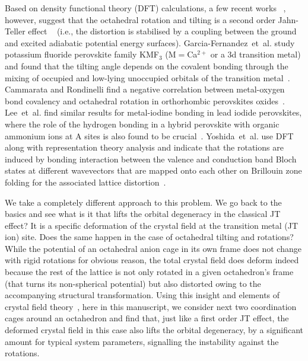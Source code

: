\documentclass[a4paper,prb,twocolumn]{revtex4-1}  %
\newcommand{\az}[1]{{\color{magenta}{#1}}} %
\begin{document}
Based on density functional theory (DFT) calculations,
a few recent works
~\cite{garcia-fernandezJPCL10,CammarataJCP14,LeeCM16,YoshidaPRL21}, 
however, 
suggest that the octahedral rotation and tilting is 
a second order Jahn-Teller effect
~\cite{HerzbergZPC33,BersukerPL66,KristoffelPSSB67,PearsonJMS83,FultonJCP04,BersukerCR13}
(i.e., the distortion is stabilised by a coupling between the ground and excited adiabatic potential energy surfaces).
Garcia-Fernandez~et~al.
study
potassium fluoride perovskite family KMF$_3$ (M$=$Ca$^{2+}$ or a $3$d transition metal)
and found that the tilting angle
depends on the covalent bonding through the mixing of occupied and 
low-lying unoccupied orbitals of the transition metal~\cite{garcia-fernandezJPCL10}.
Cammarata and Rondinelli
find a negative correlation between metal-oxygen bond covalency 
and octahedral rotation in orthorhombic perovskites oxides~\cite{CammarataJCP14}.
Lee~et~al. find 
similar results for metal-iodine bonding in
lead iodide perovskites,
where the role of 
the hydrogen bonding 
in a hybrid perovskite with
organic ammonium ions at A sites
is also found to be crucial~\cite{LeeCM16}.
Yoshida~et~al.
use DFT along with 
representation theory analysis 
and 
indicate that 
the rotations are induced by bonding interaction 
between the valence and conduction band Bloch states at different wavevectors
that are mapped onto each other on Brillouin zone folding
 for the associated lattice distortion~\cite{YoshidaPRL21}.
 


We take a completely different approach to this problem.
We go back to the basics
and see 
what is it that lifts 
 the orbital degeneracy in the classical JT effect?
It is a specific 
deformation of the crystal field 
at the transition metal (JT ion) site.
Does the same happen in the case of octahedral tilting and rotations?
While the potential of an octahedral anion cage 
in its own frame
does not change 
with
rigid rotations for obvious reason,
the total crystal field 
does deform indeed
because
 the rest of the lattice is not only rotated
  in a given octahedron's frame (that turns its non-spherical potential)
 but also distorted owing to the accompanying structural transformation.
Using this insight
and elements of crystal field theory~\cite{BetheAP29,VanVleckPR32,PavariniChap},
here in this manuscript,
we 
consider next two coordination cages around an octahedron
and find that,
just like a first order JT effect,
 the deformed crystal field 
in this case also lifts the orbital degeneracy,
by a significant amount for typical system parameters,
signalling the instability against the rotations.
\end{document}
